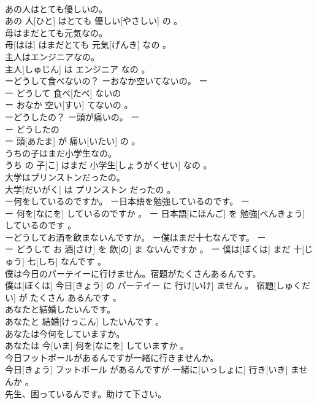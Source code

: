 \documentclass[8pt]{extreport}
\begin{document}
\begin{CJK}{UTF8}{min}
\\	あの人はとても優しいの。	
\\	あの 人[ひと] はとても 優しい[やさしい] の 。
\\	母はまだとても元気なの。	
\\	母[はは] はまだとても 元気[げんき] なの 。
\\	主人はエンジニアなの。	
\\	主人[しゅじん] は エンジニア なの 。
\\	ーどうして食べないの？ ーおなか空いてないの。	ー
\\	ー どうして 食べ[たべ] ないの 
\\	ー おなか 空い[すい] てないの 。
\\	ーどうしたの？ ー頭が痛いの。	ー
\\	ー どうしたの 
\\	ー 頭[あたま] が 痛い[いたい] の 。
\\	うちの子はまだ小学生なの。	
\\	うち の 子[こ] はまだ 小学生[しょうがくせい] なの 。
\\	大学はプリンストンだったの。	
\\	大学[だいがく] は プリンストン だったの 。
\\	ー何をしているのですか。 ー日本語を勉強しているのです。	ー
\\	ー 何を[なにを] しているのですか 。 ー 日本語[にほんご] を 勉強[べんきょう] しているのです 。
\\	ーどうしてお酒を飲まないんですか。 ー僕はまだ十七なんです。	ー
\\	ー どうして お 酒[さけ] を 飲[の] ま ないんですか 。 ー 僕は[ぼくは] まだ 十[じゅう] 七[しち] なんです 。
\\	僕は今日のパーテイーに行けません。宿題がたくさんあるんです。	
\\	僕は[ぼくは] 今日[きょう] の パーテイー に 行け[いけ] ません 。 宿題[しゅくだい] が たくさん あるんです 。
\\	あなたと結婚したいんです。	
\\	あなたと 結婚[けっこん] したいんです 。
\\	あなたは今何をしていますか。	
\\	あなたは 今[いま] 何を[なにを] していますか 。
\\	今日フットボールがあるんですが一緒に行きませんか。	
\\	今日[きょう] フットボール があるんですが 一緒に[いっしょに] 行き[いき] ませんか 。
\\	先生、困っているんです。助けて下さい。	

\end{CJK}
\end{document}
